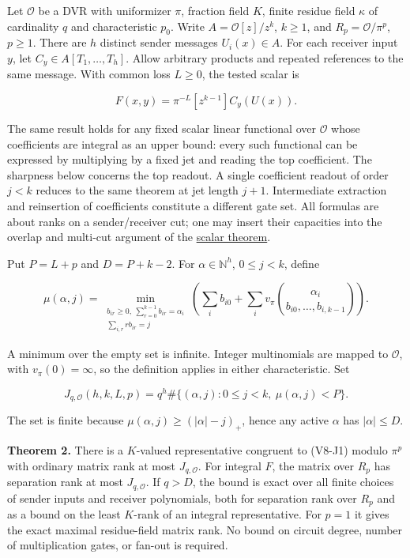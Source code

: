 \documentclass[
  11pt,
]{article}
\begin{document}
Let \(\mathcal O\) be a DVR with uniformizer \(\pi\), fraction field
\(K\), finite residue field \(\kappa\) of cardinality \(q\) and
characteristic \(p_0\). Write \(A=\mathcal O[z]/z^k\), \(k\ge1\), and
\(R_p=\mathcal O/\pi^p\), \(p\ge1\). There are \(h\) distinct sender
messages \(U_i(x)\in A\). For each receiver input \(y\), let
\(C_y\in A[T_1,\ldots,T_h]\). Allow arbitrary products and repeated
references to the same message. With common loss \(L\ge0\), the tested
scalar is

\[
                  F(x,y)=\pi^{-L}[z^{k-1}]C_y(U(x)).
                                                                    \tag{V8-J1}
\]

The same result holds for any fixed scalar linear functional over
\(\mathcal O\) whose coefficients are integral as an upper bound: every
such functional can be expressed by multiplying by a fixed jet and
reading the top coefficient. The sharpness below concerns the top
readout. A single coefficient readout of order \(j<k\) reduces to the
same theorem at jet length \(j+1\). Intermediate extraction and
reinsertion of coefficients constitute a different gate set. All
formulas are about ranks on a sender/receiver cut; one may insert their
capacities into the overlap and multi-cut argument of the
\hyperref[v8-section-nonlinear-budget]{scalar theorem}.

Put \(P=L+p\) and \(D=P+k-2\). For \(\alpha\in\mathbb N^h\),
\(0\le j<k\), define

\[
 \mu(\alpha,j)=
 \min_{\substack{b_{ir}\ge0,\ \sum_{r=0}^{k-1} b_{ir}=\alpha_i\\
                         \sum_{i,r} r b_{ir}=j}}
 \left(\sum_i b_{i0}
      +\sum_i v_\pi\!\binom{\alpha_i}{b_{i0},\ldots,b_{i,k-1}}\right).
                                                                    \tag{V8-J2}
\]

A minimum over the empty set is infinite. Integer multinomials are
mapped to \(\mathcal O\), with \(v_\pi(0)=\infty\), so the definition
applies in either characteristic. Set

\[
              J_{q,\mathcal O}(h,k,L,p)
                =q^h\#\{(\alpha,j):0\le j<k,\ \mu(\alpha,j)<P\}.
                                                                    \tag{V8-J3}
\]

The set is finite because \(\mu(\alpha,j)\ge(|\alpha|-j)_+\), hence any
active \(\alpha\) has \(|\alpha|\le D\).

\textbf{Theorem 2.} There is a \(K\)-valued representative congruent to
(V8-J1) modulo \(\pi^p\) with ordinary matrix rank at most
\(J_{q,\mathcal O}\). For integral \(F\), the matrix over \(R_p\) has
separation rank at most \(J_{q,\mathcal O}\). If \(q>D\), the bound is
exact over all finite choices of sender inputs and receiver polynomials,
both for separation rank over \(R_p\) and as a bound on the least
\(K\)-rank of an integral representative. For \(p=1\) it gives the exact
maximal residue-field matrix rank. No bound on circuit degree, number of
multiplication gates, or fan-out is required.
\end{document}
